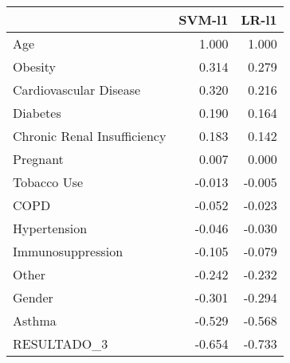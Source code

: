 \begin{tabular}{lrr}
\toprule
{} &  SVM-l1 &  LR-l1 \\
\midrule
Age                         &   1.000 &  1.000 \\
Obesity                     &   0.314 &  0.279 \\
Cardiovascular Disease      &   0.320 &  0.216 \\
Diabetes                    &   0.190 &  0.164 \\
Chronic Renal Insufficiency &   0.183 &  0.142 \\
Pregnant                    &   0.007 &  0.000 \\
Tobacco Use                 &  -0.013 & -0.005 \\
COPD                        &  -0.052 & -0.023 \\
Hypertension                &  -0.046 & -0.030 \\
Immunosuppression           &  -0.105 & -0.079 \\
Other                       &  -0.242 & -0.232 \\
Gender                      &  -0.301 & -0.294 \\
Asthma                      &  -0.529 & -0.568 \\
RESULTADO\_3                 &  -0.654 & -0.733 \\
\bottomrule
\end{tabular}
